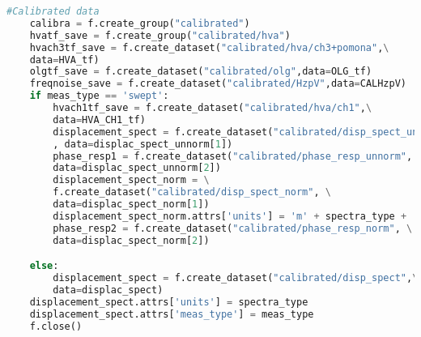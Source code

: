\begin{lstlisting}[frame=single, language=Python]
    #Calibrated data
    calibra = f.create_group("calibrated")
    hvatf_save = f.create_group("calibrated/hva")
    hvach3tf_save = f.create_dataset("calibrated/hva/ch3+pomona",\
    data=HVA_tf)
    olgtf_save = f.create_dataset("calibrated/olg",data=OLG_tf)
    freqnoise_save = f.create_dataset("calibrated/HzpV",data=CALHzpV)
    if meas_type == 'swept':
        hvach1tf_save = f.create_dataset("calibrated/hva/ch1",\
        data=HVA_CH1_tf)
        displacement_spect = f.create_dataset("calibrated/disp_spect_unnorm"\
        , data=displac_spect_unnorm[1])
        phase_resp1 = f.create_dataset("calibrated/phase_resp_unnorm", \
        data=displac_spect_unnorm[2])
        displacement_spect_norm = \
        f.create_dataset("calibrated/disp_spect_norm", \
        data=displac_spect_norm[1])
        displacement_spect_norm.attrs['units'] = 'm' + spectra_type + '/Vpk'
        phase_resp2 = f.create_dataset("calibrated/phase_resp_norm", \
        data=displac_spect_norm[2])

    else:
        displacement_spect = f.create_dataset("calibrated/disp_spect",\
        data=displac_spect)
    displacement_spect.attrs['units'] = spectra_type
    displacement_spect.attrs['meas_type'] = meas_type
    f.close()
\end{lstlisting}

